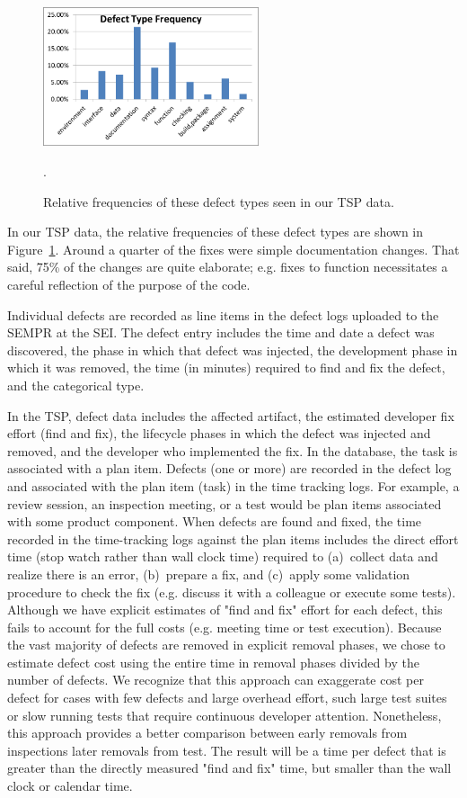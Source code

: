 \documentclass[smallcondensed]{svjour3}
\newcommand{\fig}[1]{Figure~\ref{fig:#1}}
\begin{document}
\begin{figure}[t]
\begin{center}
\includegraphics[width=2.5in]{defect_type_frequency.png}
\end{center}
\caption{Relative frequencies of these defect types seen in our TSP data.}\label{fig:dtypes}.
\end{figure}
In our TSP data,  the relative frequencies of these defect types are shown in \fig{dtypes}. Around a quarter of the fixes were simple documentation changes.
That said, 75\% of the changes are quite elaborate;   e.g. fixes to function necessitates a careful reflection of the purpose of the code.

Individual defects are recorded as line items in the defect logs uploaded to the SEMPR at the SEI. The defect entry includes the time and date a defect was discovered, the phase in which that defect was injected, the development phase in which it was removed, the time (in minutes) required to find and fix the defect, and the categorical type. 

In the TSP, defect data includes the affected artifact, the estimated developer fix effort (find and fix), the lifecycle phases in which the defect was injected and removed, and the developer who implemented the fix. In the database, the task is associated with a plan item. Defects (one or more) are recorded in the defect log and associated with the plan item (task) in the time tracking logs. For example, a review session, an inspection meeting, or a test would be plan items associated with some product component. When defects are found and fixed, the time recorded in the time-tracking logs against the plan items includes the direct effort time (stop watch rather than wall clock time) required to (a)~collect data and realize there is an error, 
(b)~prepare a fix,  and (c)~apply some validation
procedure to check the fix (e.g. discuss it with a colleague or execute some tests). Although we have explicit estimates of "find and fix" effort for each defect, this fails to account for the full costs (e.g. meeting time or test execution). Because the vast majority of defects are removed in explicit removal phases, we chose to estimate defect cost using the entire time in removal phases divided by the number of defects. We recognize that this approach can exaggerate cost per defect for cases with few defects and large overhead effort, such large test suites or slow running tests that require continuous developer attention.  Nonetheless, this approach provides a better comparison between early removals from inspections later removals from test. The result will be a time per defect that is greater than the directly measured "find and fix" time, but smaller than the wall clock or calendar time. 
\end{document}
